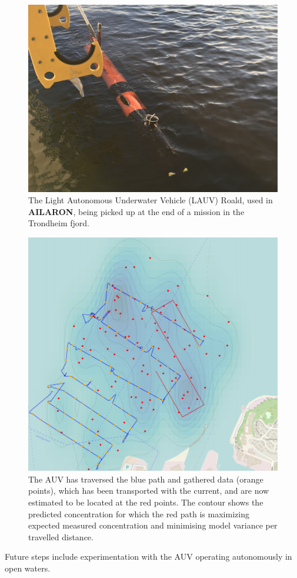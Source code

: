 \documentclass[conference]{IEEEtran}
\def\proje{{\textbf{AILARON}}}
\begin{document}
\begin{figure}[tbp]
  \centering
  \includegraphics[width=\linewidth]{figures/Roald.jpeg}
  \caption{The Light Autonomous Underwater Vehicle (LAUV) Roald, used in
    \proje, being picked up at the end of a mission in the Trondheim
    fjord.}
  \label{fig:roald}
\end{figure}

\begin{figure}[tbp]
  \centering
  \includegraphics[width=\linewidth]{figures/munkholmen_planned_path.png}
  \caption{The AUV has traversed the blue path and gathered data (orange
    points), which has been transported with the current, and are now
    estimated to be located at the red points.  The contour shows the
    predicted concentration for which the red path is maximizing
    expected measured concentration and minimising model variance per travelled distance.}
  \label{fig:munkholmen}
\end{figure}

Future steps include experimentation with the AUV operating
autonomously in open waters.




\end{document}
